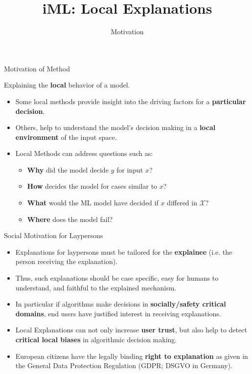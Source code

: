 \documentclass[aspectratio=169]{../latex_main/tntbeamer}  %
\title[Introduction]{iML: Local Explanations}
\subtitle{Motivation}
\begin{document}
	
	\maketitle


\begin{frame}[c]{Motivation of Method}
 
 Explaining the \textbf{local} behavior of a model.
	\begin{itemize}
		\item Some local methods provide insight into the driving factors for a \textbf{particular decision}. 
		\item Others, help to understand the model's decision making in a \textbf{local environment} of the input space.
		\pause
		\smallskip
		\item Local Methods can address questions such as: 
		\begin{itemize}
		    \item \textbf{Why} did the model decide $y$ for input $x$?
		    \item \textbf{How} decides the model for cases similar to $x$?
		    \item \textbf{What} would the ML model have decided if $x$ differed in $\mathcal{X}$?
		    \item  \textbf{Where} does the model fail?
		\end{itemize}  
	\end{itemize}
\end{frame}

\begin{frame}{Social Motivation for Laypersons}

	\begin{itemize}
		\item Explanations for laypersons must be tailored for the \textbf{explainee} (i.e. the person receiving the explanation).
		\pause\smallskip
		\item Thus, such explanations should be case specific, easy for humans to understand, and faithful to the explained mechanism.
		\pause\smallskip
		\item In particular if algorithms make decisions in \textbf{socially/safety critical domains}, end users have justified interest in receiving explanations.
		\pause\smallskip
		\item Local Explanations can not only increase \textbf{user trust}, but also help to detect \textbf{critical local biases} in algorithmic decision making.
		\pause\smallskip
		\item European citizens have the legally binding \textbf{right to explanation} as given in the General Data Protection Regulation (GDPR; DSGVO in Germany).

	\end{itemize}
\end{frame}
\end{document}
